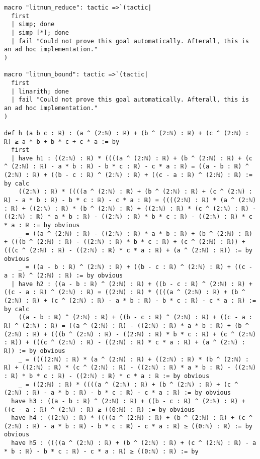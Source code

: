 \documentclass{article}
\begin{document}
\begin{tcolorbox}[colback=white!10, width=\linewidth]
\begin{lstlisting}[language=Lean4]
macro "litnum_reduce": tactic =>`(tactic|
  first
  | simp; done
  | simp [*]; done
  | fail "Could not prove this goal automatically. Afterall, this is an ad hoc implementation."
)

macro "litnum_bound": tactic =>`(tactic|
  first
  | linarith; done
  | fail "Could not prove this goal automatically. Afterall, this is an ad hoc implementation."
)

def h (a b c : ℝ) : (a ^ (2:ℕ) : ℝ) + (b ^ (2:ℕ) : ℝ) + (c ^ (2:ℕ) : ℝ) ≥ a * b + b * c + c * a := by
  first
  | have h1 : ((2:ℕ) : ℝ) * ((((a ^ (2:ℕ) : ℝ) + (b ^ (2:ℕ) : ℝ) + (c ^ (2:ℕ) : ℝ) - a * b : ℝ) - b * c : ℝ) - c * a : ℝ) = ((a - b : ℝ) ^ (2:ℕ) : ℝ) + ((b - c : ℝ) ^ (2:ℕ) : ℝ) + ((c - a : ℝ) ^ (2:ℕ) : ℝ) := by calc
    ((2:ℕ) : ℝ) * ((((a ^ (2:ℕ) : ℝ) + (b ^ (2:ℕ) : ℝ) + (c ^ (2:ℕ) : ℝ) - a * b : ℝ) - b * c : ℝ) - c * a : ℝ) = ((((2:ℕ) : ℝ) * (a ^ (2:ℕ) : ℝ) + ((2:ℕ) : ℝ) * (b ^ (2:ℕ) : ℝ) + ((2:ℕ) : ℝ) * (c ^ (2:ℕ) : ℝ) - ((2:ℕ) : ℝ) * a * b : ℝ) - ((2:ℕ) : ℝ) * b * c : ℝ) - ((2:ℕ) : ℝ) * c * a : ℝ := by obvious
    _ = ((a ^ (2:ℕ) : ℝ) - ((2:ℕ) : ℝ) * a * b : ℝ) + (b ^ (2:ℕ) : ℝ) + (((b ^ (2:ℕ) : ℝ) - ((2:ℕ) : ℝ) * b * c : ℝ) + (c ^ (2:ℕ) : ℝ)) + (((c ^ (2:ℕ) : ℝ) - ((2:ℕ) : ℝ) * c * a : ℝ) + (a ^ (2:ℕ) : ℝ)) := by obvious
    _ = ((a - b : ℝ) ^ (2:ℕ) : ℝ) + ((b - c : ℝ) ^ (2:ℕ) : ℝ) + ((c - a : ℝ) ^ (2:ℕ) : ℝ) := by obvious
  | have h2 : ((a - b : ℝ) ^ (2:ℕ) : ℝ) + ((b - c : ℝ) ^ (2:ℕ) : ℝ) + ((c - a : ℝ) ^ (2:ℕ) : ℝ) = ((2:ℕ) : ℝ) * ((((a ^ (2:ℕ) : ℝ) + (b ^ (2:ℕ) : ℝ) + (c ^ (2:ℕ) : ℝ) - a * b : ℝ) - b * c : ℝ) - c * a : ℝ) := by calc
    ((a - b : ℝ) ^ (2:ℕ) : ℝ) + ((b - c : ℝ) ^ (2:ℕ) : ℝ) + ((c - a : ℝ) ^ (2:ℕ) : ℝ) = ((a ^ (2:ℕ) : ℝ) - ((2:ℕ) : ℝ) * a * b : ℝ) + (b ^ (2:ℕ) : ℝ) + (((b ^ (2:ℕ) : ℝ) - ((2:ℕ) : ℝ) * b * c : ℝ) + (c ^ (2:ℕ) : ℝ)) + (((c ^ (2:ℕ) : ℝ) - ((2:ℕ) : ℝ) * c * a : ℝ) + (a ^ (2:ℕ) : ℝ)) := by obvious
    _ = ((((2:ℕ) : ℝ) * (a ^ (2:ℕ) : ℝ) + ((2:ℕ) : ℝ) * (b ^ (2:ℕ) : ℝ) + ((2:ℕ) : ℝ) * (c ^ (2:ℕ) : ℝ) - ((2:ℕ) : ℝ) * a * b : ℝ) - ((2:ℕ) : ℝ) * b * c : ℝ) - ((2:ℕ) : ℝ) * c * a : ℝ := by obvious
    _ = ((2:ℕ) : ℝ) * ((((a ^ (2:ℕ) : ℝ) + (b ^ (2:ℕ) : ℝ) + (c ^ (2:ℕ) : ℝ) - a * b : ℝ) - b * c : ℝ) - c * a : ℝ) := by obvious
  have h3 : ((a - b : ℝ) ^ (2:ℕ) : ℝ) + ((b - c : ℝ) ^ (2:ℕ) : ℝ) + ((c - a : ℝ) ^ (2:ℕ) : ℝ) ≥ ((0:ℕ) : ℝ) := by obvious
  have h4 : ((2:ℕ) : ℝ) * ((((a ^ (2:ℕ) : ℝ) + (b ^ (2:ℕ) : ℝ) + (c ^ (2:ℕ) : ℝ) - a * b : ℝ) - b * c : ℝ) - c * a : ℝ) ≥ ((0:ℕ) : ℝ) := by obvious
  have h5 : ((((a ^ (2:ℕ) : ℝ) + (b ^ (2:ℕ) : ℝ) + (c ^ (2:ℕ) : ℝ) - a * b : ℝ) - b * c : ℝ) - c * a : ℝ) ≥ ((0:ℕ) : ℝ) := by

\end{lstlisting}
\end{tcolorbox}
\end{document}
